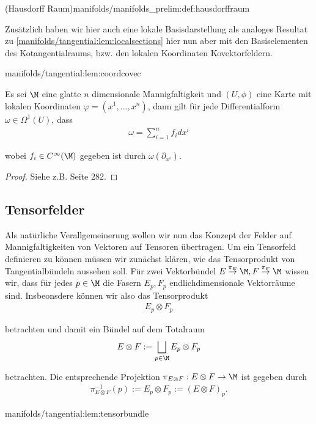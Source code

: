 \documentclass[letterpaper,10pt,english]{jupyterBook}
\begin{document}
\begin{definition}{(Hausdorff Raum)}{manifolds/manifolds_prelim:def:hausdorffraum}
\par
Zusätzlich haben wir hier auch eine lokale Basisdarstellung als analoges Resultat zu \cref{manifolds/tangential:lem:localsections} hier nun aber mit den Basiselementen des Kotangentialraums, bzw. den lokalen Koordinaten Kovektorfeldern.
\begin{lemma}{}{manifolds/tangential:lem:coordcovec}



\par
Es sei \(\M\) eine glatte \(n\) dimensionale Mannigfaltigkeit und \((U,\phi)\) eine Karte mit lokalen Koordinaten \(\varphi=(x^1,\ldots, x^n)\),  dann gilt für jede Differentialform \(\omega\in\Omega^1(U)\), dass
\begin{align*}
\omega = \sum_{i=1}^n f_i dx^i
\end{align*}
\par
wobei \(f_i\in C^\infty(\M)\) gegeben ist durch \(\omega(\partial_{x^i})\).
\end{lemma}

\begin{proof}
 Siehe z.B. \cite{Lee03} Seite 282.
\end{proof}


\subsection{Tensorfelder}
\label{\detokenize{manifolds/tangential:tensorfelder}}
\par
Als natürliche Verallgemeinerung wollen wir nun das Konzept der Felder auf Mannigfaltigkeiten von Vektoren auf Tensoren übertragen. Um ein Tensorfeld definieren zu können müssen wir zunächst klären, wie das Tensorprodukt von Tangentialbündeln aussehen soll. Für zwei Vektorbündel \(E\overset{\pi_E}{\to}{\M}, F\overset{\pi_F}{\to}{\M}\) wissen wir, dass für jedes \(p\in\M\) die Fasern \(E_p, F_p\) endlichdimensionale Vektorräume sind. Insbeonsdere können wir also das Tensorprodukt
\begin{align*}
E_p\otimes F_p
\end{align*}
\par
betrachten und damit ein Bündel auf dem Totalraum
\begin{align*}
E\otimes F:= \bigsqcup_{p\in\M} E_p\otimes F_p
\end{align*}
\par
betrachten. Die entsprechende Projektion \(\pi_{E\otimes F}:E\otimes F\to\M\) ist gegeben durch
\begin{align*}
\pi_{E\otimes F}^{-1}(p):= E_p\otimes F_p := (E\otimes F)_p.
\end{align*}\begin{lemma}{}{manifolds/tangential:lem:tensorbundle}




\end{lemma}
\end{definition}
\end{document}
